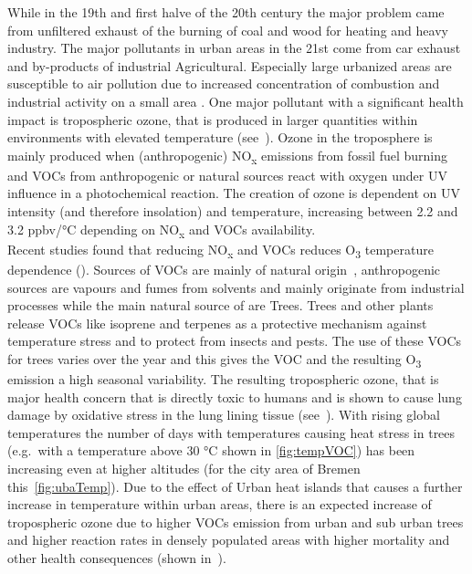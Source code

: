 \documentclass[12pt,a4paper, english,twoside]{article}
\begin{document}
      While in the 19th and first halve of the 20th century the major problem came from unfiltered exhaust of the burning of coal and wood for heating and heavy industry.
      The major pollutants in urban areas in the 21st come from car exhaust and by-products of industrial Agricultural. %
      Especially large urbanized areas are susceptible to air pollution due to increased concentration of combustion and industrial activity on a small area \autocite{Kanakidou2011}.
      One major pollutant with a significant health impact is tropospheric ozone, that is produced in larger quantities within environments with elevated temperature (see~\cite{Ebi2008}). 
      Ozone in the troposphere is mainly produced when (anthropogenic) NO\textsubscript{x} emissions from fossil fuel burning and \glspl{VOC} from anthropogenic or natural sources react with oxygen under UV influence in a photochemical reaction.  
      The creation of ozone is dependent on UV intensity (and therefore insolation) and temperature, increasing between 2.2 and 3.2 ppbv/°C depending on NO\textsubscript{x} and \glspl{VOC} availability. \\
      Recent studies found that reducing NO\textsubscript{x} and \glspl{VOC} reduces O\textsubscript{3} temperature dependence (\cite{Otero2021}).
      Sources of \glspl{VOC} are mainly of natural origin~\autocite{Kansal2009}, anthropogenic sources are vapours and fumes from solvents and mainly originate from industrial processes while the main natural source of  are Trees.
      Trees and other plants release VOCs like isoprene and terpenes as a protective mechanism against temperature stress and to protect from insects and pests. 
      The use of these \glspl{VOC} for trees varies over the year and this gives the \gls{VOC} and the resulting O\textsubscript{3} emission a high seasonal variability. 
      The resulting tropospheric ozone, that is major health concern that is directly toxic to humans and is shown to cause lung damage by oxidative stress in the lung lining tissue (see~\cite{Mudway2000}). 
      With rising global temperatures the number of days with temperatures causing heat stress in trees (e.g.\ with a temperature above 30 °C shown in \cref{fig:tempVOC}) has been increasing even at higher altitudes (for the city area of Bremen this~\cref{fig:ubaTemp}).
      Due to the effect of Urban heat islands that causes a further increase in temperature within urban areas, there is an expected increase of tropospheric ozone due to higher \glspl{VOC} emission from urban and sub urban trees and higher reaction rates in densely populated areas with higher mortality and other health consequences (shown in~\cite{Ebi2008}).\\ 
\end{document}
